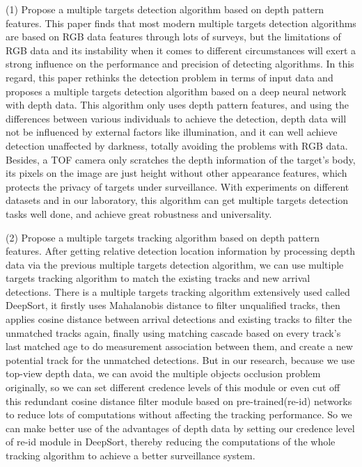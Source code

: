 (1) Propose a multiple targets detection algorithm based on depth pattern features. This paper finds that most modern multiple targets detection 
algorithms are based on RGB data features through lots of surveys, but the limitations of RGB data and its instability when it comes to different 
circumstances will exert a strong influence on the performance and precision of detecting algorithms. 
In this regard, this paper rethinks the detection problem in terms of input data and proposes a multiple targets detection algorithm based on a deep 
neural network with depth data. This algorithm only uses depth pattern features, and using the differences between various individuals to achieve 
the detection, depth data will not be influenced by external factors like illumination, and it can well achieve detection unaffected by darkness, 
totally avoiding the problems with RGB data. Besides, a TOF camera only scratches the depth information of the target's body, 
its pixels on the image are just height without other appearance features, which protects the privacy of targets under surveillance. 
With experiments on different datasets and in our laboratory, this algorithm can get multiple targets detection tasks well done, 
and achieve great robustness and universality.

(2) Propose a multiple targets tracking algorithm based on depth pattern features. After getting relative detection location information by processing 
depth data via the previous multiple targets detection algorithm, we can use multiple targets tracking algorithm to match the existing tracks and 
new arrival detections. There is a multiple targets tracking algorithm extensively used called DeepSort, 
it firstly uses Mahalanobis distance to filter unqualified tracks, 
then applies cosine distance between arrival detections and existing tracks to filter the unmatched tracks again, 
finally using matching cascade based on every track's last matched age to do measurement association between them, 
and create a new potential track for the unmatched detections. But in our research, because we use top-view depth data, 
we can avoid the multiple objects occlusion problem originally, so we can set different credence levels of this module or 
even cut off this redundant cosine distance filter module based on pre-trained(re-id) networks to reduce lots of computations without 
affecting the tracking performance. So we can make better use of the advantages of depth data by setting our credence level of re-id module in DeepSort, 
thereby reducing the computations of the whole tracking algorithm to achieve a better surveillance system.

